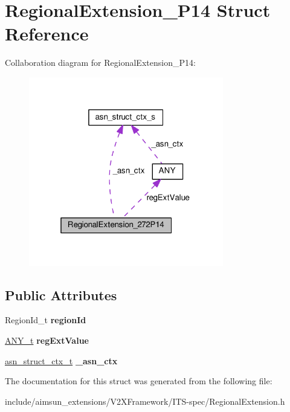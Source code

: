 \hypertarget{structRegionalExtension__272P14}{}\section{Regional\+Extension\+\_\+P14 Struct Reference}
\label{structRegionalExtension__272P14}


Collaboration diagram for Regional\+Extension\+\_\+P14\+:\nopagebreak
\begin{figure}[H]
\begin{center}
\leavevmode
\includegraphics[width=241pt]{structRegionalExtension__272P14__coll__graph}
\end{center}
\end{figure}
\subsection*{Public Attributes}
\begin{DoxyCompactItemize}
\item 
Region\+Id\+\_\+t {\bfseries region\+Id}\hypertarget{structRegionalExtension__272P14_a630a8013648b3a58baeda7aa38fdb29f}{}\label{structRegionalExtension__272P14_a630a8013648b3a58baeda7aa38fdb29f}

\item 
\hyperlink{structANY}{A\+N\+Y\+\_\+t} {\bfseries reg\+Ext\+Value}\hypertarget{structRegionalExtension__272P14_ad40052fe4be1c65d51bfe32db5d7f68b}{}\label{structRegionalExtension__272P14_ad40052fe4be1c65d51bfe32db5d7f68b}

\item 
\hyperlink{structasn__struct__ctx__s}{asn\+\_\+struct\+\_\+ctx\+\_\+t} {\bfseries \+\_\+asn\+\_\+ctx}\hypertarget{structRegionalExtension__272P14_aff299c61b604ee22ec5f40361a053de0}{}\label{structRegionalExtension__272P14_aff299c61b604ee22ec5f40361a053de0}

\end{DoxyCompactItemize}


The documentation for this struct was generated from the following file\+:\begin{DoxyCompactItemize}
\item 
include/aimsun\+\_\+extensions/\+V2\+X\+Framework/\+I\+T\+S-\/spec/Regional\+Extension.\+h\end{DoxyCompactItemize}

